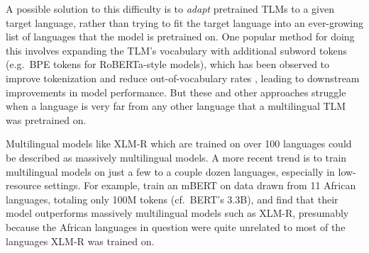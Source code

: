 \documentclass[11pt]{article}
\begin{document}
A possible solution to this difficulty is to {\it adapt} pretrained TLMs to a given target language, rather than trying to fit the target language into an ever-growing list of languages that the model is pretrained on.
One popular method for doing this involves expanding the TLM's vocabulary with additional subword tokens (e.g.~BPE tokens for RoBERTa-style models), which has been observed to improve tokenization and reduce out-of-vocabulary rates \citep{wang_extending_2020,artetxe-etal-2020-cross,chau_parsing_2020,ebrahimi_how_2021}, leading to downstream improvements in model performance.
But these and other approaches struggle when a language is very far from any other language that a multilingual TLM was pretrained on.

Multilingual models like XLM-R which are trained on over 100 languages could be described as massively multilingual models.
A more recent trend is to train multilingual models on just a few to a couple dozen languages, especially in low-resource settings.
For example, \citet{ogueji_small_2021} train an mBERT on data drawn from 11 African languages, totaling only 100M tokens (cf.~BERT's 3.3B), and find that their model outperforms massively multilingual models such as XLM-R, presumably because the African languages in question were quite unrelated to most of the languages \mbox{XLM-R} was trained on.
\end{document}
